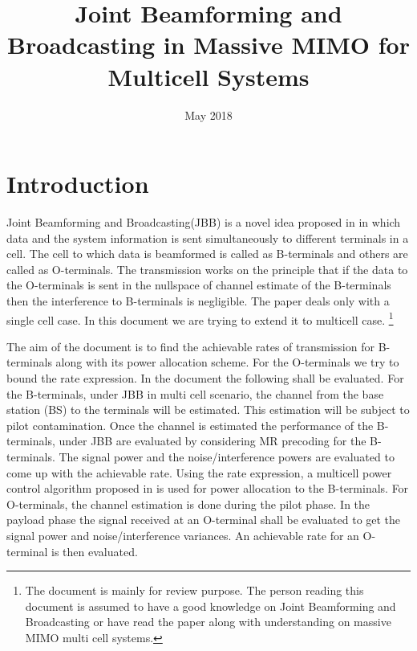 \documentclass[10pt, a4paper, twoside,fleqn]{article}
\title{Joint Beamforming and Broadcasting in Massive MIMO for Multicell Systems}
\author{}
\date{May 2018}
\begin{document}
\maketitle
 
\section{Introduction}
	Joint Beamforming and Broadcasting(JBB) is a novel idea proposed in \cite{bib:jbb} in which data and the system information is sent simultaneously to different terminals in a cell. The cell to which data is beamformed is called as B-terminals and others are called as O-terminals. The transmission works on the principle that if the data to the O-terminals is sent in the nullspace of channel estimate of the B-terminals then the interference to B-terminals is negligible. The paper \cite{bib:jbb} deals only with a single cell case. In this document we are trying to extend it to multicell case.
\footnote{The document is mainly for review purpose. The person reading this document is assumed to have a good knowledge on Joint Beamforming and Broadcasting or have read the paper \cite{bib:jbb} along with understanding on massive MIMO multi cell systems.}
	
	The aim of the document is to find the achievable rates of transmission for B-terminals along with its power allocation scheme. For the O-terminals we try to bound the rate expression. In the document the following shall be evaluated. For the B-terminals, under JBB in multi cell scenario, the channel from the base station (BS) to the terminals will be estimated. This estimation will be subject to pilot contamination. Once the channel is estimated the performance of the B-terminals, under JBB are evaluated by considering MR precoding for the B-terminals. The signal power and the noise/interference powers are evaluated to come up with the achievable rate. Using the rate expression, a multicell power control algorithm proposed in \cite{bib:MassiveMimoBook} is used for power allocation to the B-terminals.
     For O-terminals, the channel estimation is done during the pilot phase. In the payload phase the signal received at an O-terminal shall be evaluated to get the signal power and noise/interference variances. An achievable rate for an O-terminal is then evaluated.
\end{document}
